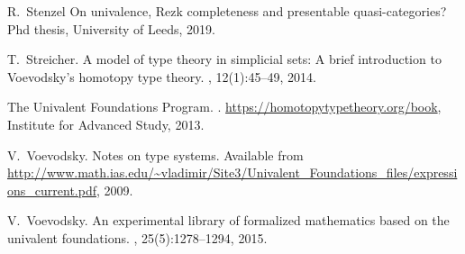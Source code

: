\documentclass[reqno,10pt,a4paper,oneside]{amsart}
\numberwithin{equation}{section}
\theoremstyle{mythm}
\theoremstyle{mydef}
\theoremstyle{myrmk}
\begin{document}
\begin{thebibliography}{{}dBM15}
    R.~Stenzel
    \newblock On univalence, Rezk completeness and presentable quasi-categories?
    \newblock Phd thesis, University of Leeds, 2019.
    

T.~Streicher.
\newblock A model of type theory in simplicial sets: {A} brief introduction to
  {V}oevodsky's homotopy type theory.
, 12(1):45--49, 2014.

The {Univalent Foundations Program}.
.
\newblock \url{https://homotopytypetheory.org/book}, Institute for Advanced
  Study, 2013.

V.~Voevodsky.
\newblock Notes on type systems.
\newblock Available from
  \url{http://www.math.ias.edu/~vladimir/Site3/Univalent_Foundations_files/expressions_current.pdf},
  2009.

V.~Voevodsky.
\newblock An experimental library of formalized mathematics based on the
  univalent foundations.
, 25(5):1278--1294,
  2015.

\end{thebibliography}
\end{document}
